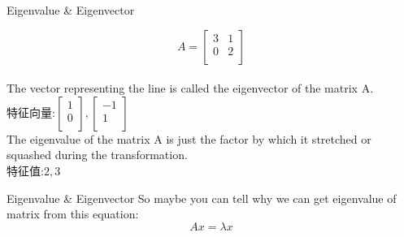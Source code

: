 \documentclass[10pt,aspectratio=43,mathserif,table]{beamer}
\begin{document}
\begin{frame}{Eigenvalue \& Eigenvector}
\begin{multicols}{2}

		\hfill
		$$A = \left[\begin{array}{rr}
					3 & 1 \\
					0 & 2 \\
				\end{array}\right]$$\\[0.2cm]
		The vector representing the line is called the eigenvector of the matrix A.\\[0.2cm]
		特征向量:$\left[\begin{array}{r}
					1 \\
					0 \\
				\end{array}\right],\left[\begin{array}{r}
					-1 \\
					1  \\
				\end{array}\right]$\\[0.2cm]
		The eigenvalue of the matrix A is just the factor by which it stretched or squashed during the transformation.\\[0.2cm]
		特征值:$2,3$
	\end{multicols}
\end{frame}

\begin{frame}{Eigenvalue \& Eigenvector}
	So maybe you can tell why we can get eigenvalue of matrix from this equation:
	$$Ax = \lambda x$$
\end{frame}
\end{document}
